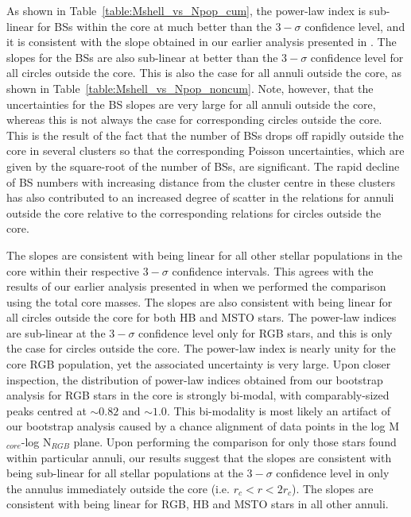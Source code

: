 As shown in Table~\ref{table:Mshell_vs_Npop_cum}, the power-law index
is sub-linear for BSs within the core at much better than the
$3-\sigma$ confidence level, and it is consistent with the slope 
obtained in our earlier analysis presented in \citet{knigge09}.  The
slopes for the BSs are also sub-linear 
at better than the $3-\sigma$ confidence level for all circles outside the
core.  This is also the case for all annuli outside the core, as shown
in Table~\ref{table:Mshell_vs_Npop_noncum}.  Note, however, that the
uncertainties for the BS slopes are very 
large for all annuli outside the core, whereas this is not always the case
for corresponding circles outside the core.  This is the result of the
fact that the number of BSs drops off rapidly outside
the core in several clusters so that the corresponding Poisson
uncertainties, which are given by the square-root of the number of
BSs, are significant.  The rapid decline of BS numbers with 
increasing distance from the cluster centre in these clusters has also
contributed to an 
increased degree of scatter in the relations for annuli outside the core
relative to the corresponding relations for circles outside the core.

The slopes are consistent with being linear for all other stellar
populations in the core within their respective $3-\sigma$ confidence
intervals.  This agrees with the results of our earlier analysis
presented in \citet{leigh09} when we performed the comparison using
the total core masses.  The slopes are also consistent with being 
linear for all circles outside 
the core for both HB and MSTO stars.  The power-law indices are sub-linear 
at the $3-\sigma$ confidence level only for RGB stars, and this is
only the case for circles outside the core.  The power-law index is
nearly unity for the core RGB population, 
yet the associated uncertainty is very large.  Upon closer inspection,
the distribution of power-law indices obtained from our bootstrap
analysis for RGB stars in the core is strongly bi-modal, with
comparably-sized peaks centred at $\sim 0.82$ and $\sim 1.0$.  This
bi-modality is most likely an artifact of our bootstrap analysis
caused by a chance 
alignment of data points in the log M$_{core}$-log N$_{RGB}$ plane.  
Upon performing the comparison for only those stars found within 
particular annuli, our results suggest that the slopes are consistent
with being sub-linear for all stellar 
populations at the $3-\sigma$ confidence level in only the annulus
immediately outside the core (i.e. $r_c < r < 2r_c$).  The slopes are
consistent with being linear for RGB, HB and MSTO stars in all other
annuli.

